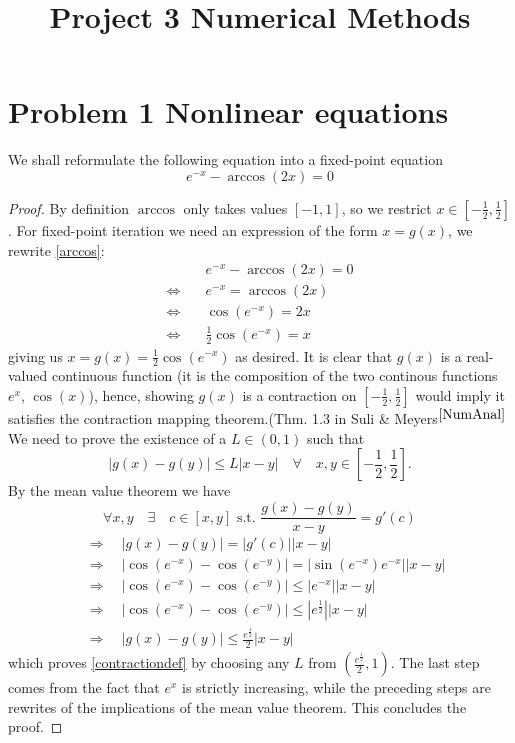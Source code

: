 \title{Project 3 Numerical Methods}
\maketitle

\newpage
\section{Problem 1 Nonlinear equations}
We shall reformulate the following equation into a fixed-point equation
\begin{equation} e^{-x}-\arccos (2 x)=0 \end{equation}\label{arccos}
\begin{proof}
By definition $\arccos$ only takes values $[-1,1]$, so we restrict $x\in[-\frac{1}{2}, \frac{1}{2}]$. For fixed-point iteration we need an expression of the form $x=g(x)$, we rewrite \ref{arccos}:
\begin{align*}
   & e^{-x}-\arccos(2x)=0  \\
   \Leftrightarrow \quad & e^{-x}=\arccos(2x) \\
   \Leftrightarrow \quad & \cos(e^{-x})=2x \\
   \Leftrightarrow \quad & \frac{1}{2}\cos(e^{-x})=x
\end{align*}
giving us $x=g(x)=\frac{1}{2}\cos(e^{-x})$ as desired. It is clear that $g(x)$ is a real-valued continuous function (it is the composition of the two continous functions $e^x$, $\cos(x)$), hence, showing $g(x)$ is a contraction on $[-\frac{1}{2}, \frac{1}{2}]$ would imply it satisfies the contraction mapping theorem.(Thm. 1.3 in Suli \& Meyers$^{\ref{NumAnal}}$
\newline We need to prove the existence of a $L\in (0,1)$ such that
  \begin{equation}
    |g(x)-g(y)|\leq L|x-y| \quad\forall\quad x,y\in[-\frac{1}{2}, \frac{1}{2}].
  \end{equation}\label{contractiondef}
By the mean value theorem we have
  $$ \forall x,y \quad \exists \quad c\in[x,y] \text{ s.t. } \frac{g(x)-g(y)}{x-y}=g'(c) $$
\begin{align*}
  & \Rightarrow \quad |g(x)-g(y)|=|g'(c)||x-y| \\
  & \Rightarrow \quad |\cos(e^{-x})-\cos(e^{-y})|=|\sin(e^{-x})e^{-x}||x-y| \\
  & \Rightarrow \quad |\cos(e^{-x})-\cos(e^{-y})|\leq |e^{-x}||x-y| \\
  & \Rightarrow \quad |\cos(e^{-x})-\cos(e^{-y})|\leq |e^{\frac{1}{2}}||x-y| \\
  & \Rightarrow \quad |g(x)-g(y)| \leq \frac{e^{\frac{1}{2}}}{2}|x-y|
\end{align*}
which proves \ref{contractiondef} by choosing any $L$ from $(\frac{e^{\frac{1}{2}}}{2}, 1)$. The last step comes from the fact that $e^x$ is strictly increasing, while the preceding steps are rewrites of the implications of the mean value theorem.
\newline This concludes the proof.
\end{proof}

